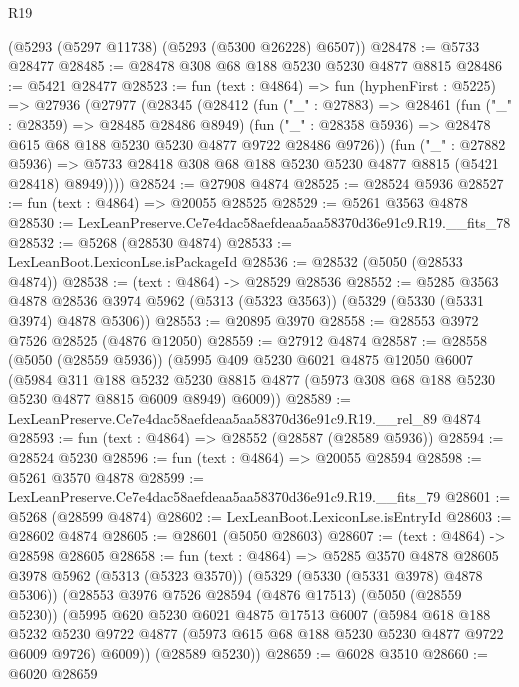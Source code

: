 \begin{lexlean}{R19}
\begin{coremodule}
    (@5293 (@5297 @11738) (@5293 (@5300 @26228) @6507))
@28478 := @5733 @28477
@28485 := @28478 @308 @68 @188 @5230 @5230 @4877 @8815
@28486 := @5421 @28477
@28523 := fun (text : @4864) =>
  fun (hyphenFirst : @5225) =>
  @27936
    (@27977
      (@28345
        (@28412
          (fun ("_" : @27883) =>
          @28461
            (fun ("_" : @28359) => @28485 @28486 @8949)
            (fun ("_" : @28358 @5936) => @28478 @615 @68 @188 @5230 @5230 @4877 @9722 @28486 @9726))
          (fun ("_" : @27882 @5936) =>
          @5733 @28418 @308 @68 @188 @5230 @5230 @4877 @8815 (@5421 @28418) @8949))))
@28524 := @27908 @4874
@28525 := @28524 @5936
@28527 := fun (text : @4864) => @20055 @28525
@28529 := @5261 @3563 @4878
@28530 := LexLeanPreserve.Ce7e4dac58aefdeaa5aa58370d36e91c9.R19.__fits_78
@28532 := @5268 (@28530 @4874)
@28533 := LexLeanBoot.LexiconLse.isPackageId
@28536 := @28532 (@5050 (@28533 @4874))
@28538 := (text : @4864) -> @28529 @28536
@28552 := @5285
    @3563
    @4878
    @28536
    @3974
    @5962
    (@5313 (@5323 @3563))
    (@5329 (@5330 (@5331 @3974) @4878 @5306))
@28553 := @20895 @3970
@28558 := @28553 @3972 @7526 @28525 (@4876 @12050)
@28559 := @27912 @4874
@28587 := @28558
    (@5050 (@28559 @5936))
    (@5995
      @409
      @5230
      @6021
      @4875
      @12050
      @6007
      (@5984
        @311
        @188
        @5232
        @5230
        @8815
        @4877
        (@5973 @308 @68 @188 @5230 @5230 @4877 @8815 @6009 @8949)
        @6009))
@28589 := LexLeanPreserve.Ce7e4dac58aefdeaa5aa58370d36e91c9.R19.__rel_89 @4874
@28593 := fun (text : @4864) => @28552 (@28587 (@28589 @5936))
@28594 := @28524 @5230
@28596 := fun (text : @4864) => @20055 @28594
@28598 := @5261 @3570 @4878
@28599 := LexLeanPreserve.Ce7e4dac58aefdeaa5aa58370d36e91c9.R19.__fits_79
@28601 := @5268 (@28599 @4874)
@28602 := LexLeanBoot.LexiconLse.isEntryId
@28603 := @28602 @4874
@28605 := @28601 (@5050 @28603)
@28607 := (text : @4864) -> @28598 @28605
@28658 := fun (text : @4864) =>
  @5285
    @3570
    @4878
    @28605
    @3978
    @5962
    (@5313 (@5323 @3570))
    (@5329 (@5330 (@5331 @3978) @4878 @5306))
    (@28553
      @3976
      @7526
      @28594
      (@4876 @17513)
      (@5050 (@28559 @5230))
      (@5995
        @620
        @5230
        @6021
        @4875
        @17513
        @6007
        (@5984
          @618
          @188
          @5232
          @5230
          @9722
          @4877
          (@5973 @615 @68 @188 @5230 @5230 @4877 @9722 @6009 @9726)
          @6009))
      (@28589 @5230))
@28659 := @6028 @3510
@28660 := @6020 @28659

\end{coremodule}
\end{lexlean}
